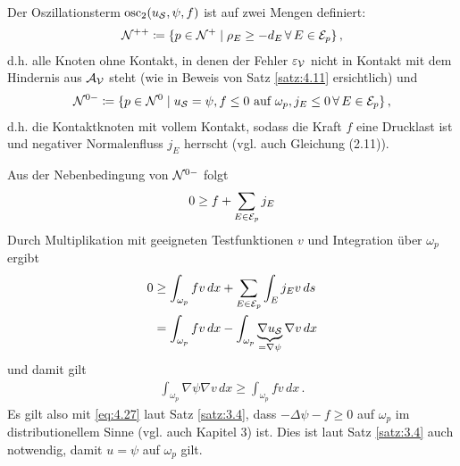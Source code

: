 

Der Oszillationsterm $\operatorname{osc}_2(u_{\mathcal S}, \psi, f)$ ist auf zwei Mengen definiert:
\begin{align}\label{eq:4.25}
	\mathcal N^{++} \coloneqq \{p \in \mathcal N^{+}\mid \rho_E \ge - d_E \, \forall \, E \in \mathcal E_p\} \, ,
\end{align}
d.h. alle Knoten ohne Kontakt, in denen der Fehler $\varepsilon_{\mathcal V}$ nicht in Kontakt mit dem Hindernis aus $\mathcal A_{\mathcal V}$ steht (wie in Beweis von Satz \ref{satz:4.11} ersichtlich) und
\begin{align}\label{eq:4.26}
	\mathcal N^{0-}\coloneqq \{ p \in \mathcal N^0 \mid u_{\mathcal S} = \psi , f \le 0 \text{ auf } \omega_p, j_E \le 0 \, \forall \, E \in \mathcal E_p \} \, ,
\end{align}
d.h. die Kontaktknoten mit vollem Kontakt, sodass die Kraft $f$ eine Drucklast ist und negativer Normalenfluss $j_E$ herrscht (vgl. auch \cite{SiebVee} Gleichung (2.11)).


Aus der Nebenbedingung von $\mathcal N^{0-}$ folgt
\begin{align*}
	0 \ge f + \sum_{E \in \mathcal E_p} j_E
\end{align*}
Durch Multiplikation mit geeigneten Testfunktionen $v$ und Integration über $\omega_p$ ergibt
\begin{align*}
	0 &  \ge \int_{\omega_p} f v \, dx + \sum_{E\in \mathcal E_p} \int_E j_E v \, ds \\
	& = \int_{\omega_p} f v \, dx - \int_{\omega_p} \underbrace{\nabla u_{\mathcal S}}_{=\nabla \psi} \nabla v \, dx
\end{align*}
und damit gilt
\begin{align}\label{eq:4.27}
	 \int_{\omega_p} {\nabla \psi} \nabla v \, dx \ge \int_{\omega_p} f v \, dx \, .
\end{align}
Es gilt also mit \eqref{eq:4.27} laut Satz \ref{satz:3.4}, dass $-\Delta \psi - f \ge 0$ auf $\omega_p$ im distributionellem Sinne (vgl. auch \cite{Walker} Kapitel 3) ist. Dies ist laut Satz \ref{satz:3.4} auch notwendig, damit $u = \psi$ auf $\omega_p$ gilt.


